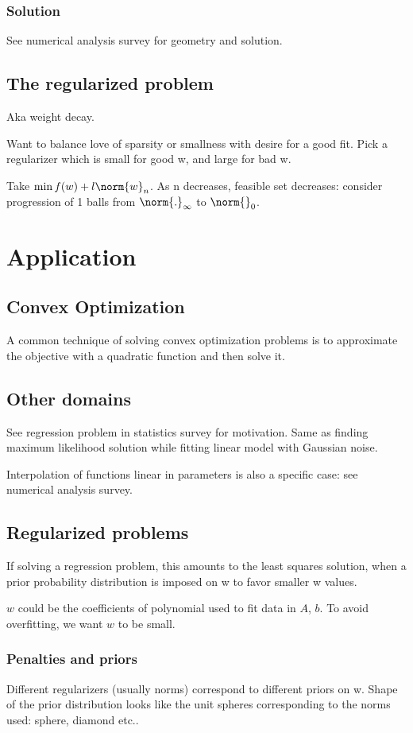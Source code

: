 \documentclass[oneside, article]{memoir}
\begin{document}
\subsubsection{Solution}
See numerical analysis survey for geometry and solution.

\subsection{The regularized problem}
Aka weight decay.

Want to balance love of sparsity or smallness with desire for a good fit. Pick a regularizer which is small for good w, and large for bad w.

Take $\min f(w) + l\norm{w}_n$. As n decreases, feasible set decreases: consider progression of 1 balls from $\norm{.}_\infty$ to $\norm{}_0$.

\section{Application}
\subsection{Convex Optimization}
A common technique of solving convex optimization problems is to  approximate the objective with a quadratic function and then solve it.

\subsection{Other domains}
See regression problem in statistics survey for motivation. Same as finding maximum likelihood solution while fitting linear model with Gaussian noise.

Interpolation of functions linear in parameters is also a specific case: see numerical analysis survey.

\subsection{Regularized problems}
If solving a regression problem, this amounts to the least squares solution, when a prior probability distribution is imposed on w to favor smaller w values.

$w$ could be the coefficients of polynomial used to fit data in $A$, $b$. To avoid overfitting, we want $w$ to be small.

\subsubsection{Penalties and priors}
Different regularizers (usually norms) correspond to different priors on w. Shape of the prior distribution looks like the unit spheres corresponding to the norms used: sphere, diamond etc..
\end{document}
